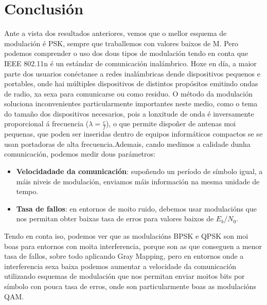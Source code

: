 \documentclass[
	10pt, %
	spanish, %
]{fphw}
\begin{document}
\section*{Conclusión}
Ante a vista dos resultados anteriores, vemos que o mellor esquema de modulación é PSK, sempre que traballemos con valores baixos de M. Pero podemos comprender o uso dos dous tipos de modulación tendo en conta que IEEE 802.11n é un estándar de comunicación inalámbrico. Hoxe en día, a maior parte dos usuarios conéctanse a redes inalámbricas dende dispositivos pequenos e portables, onde hai múltiples dispositivos de distintos propósitos emitindo ondas de radio, xa sexa para comunicarse ou como residuo. O método da modulación soluciona inconvenientes particularmente importantes neste medio, como o tema do tamaño dos dispositivos necesarios, pois a lonxitude de onda é inversamente proporcional á frecuencia ($\lambda = \frac{c}{f}$), o que permite dispoñer de antenas moi pequenas, que poden ser inseridas dentro de equipos informáticos compactos se se usan portadoras de alta frecuencia.\newline Ademais, cando medimos a calidade dunha comunicación, podemos medir dous parámetros:
\begin{itemize}
\item \textbf{Velocidadade da comunicación}: supoñendo un período de símbolo igual, a máis niveis de modulación, enviamos máis información na mesma unidade de tempo.
\item \textbf{Tasa de fallos}: en entornos de moito ruido, debemos usar modulacións que nos permitan obter baixas tasa de erros para valores baixos de $E_b/N_0$.
\end{itemize}
Tendo en conta iso, podemos ver que as modulacións BPSK e QPSK son moi boas para entornos con moita interferencia, porque son as que conseguen a menor tasa de fallos, sobre todo aplicando Gray Mapping, pero en entornos onde a interferencia sexa baixa podemos aumentar a velocidade da comunicación utilizando esquemas de modulación que nos permitan enviar moitos bits por símbolo con pouca tasa de erros, onde son particularmente boas as modulacións QAM. 
\end{document}
